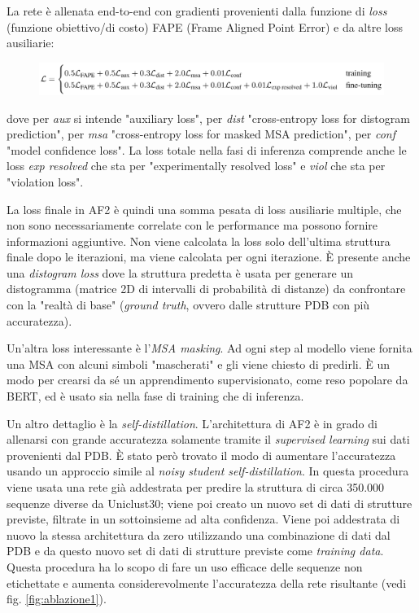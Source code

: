 La rete è allenata end-to-end con gradienti provenienti dalla funzione di \textit{loss} (funzione obiettivo/di costo) FAPE (Frame Aligned Point Error) e da altre loss ausiliarie:

\begin{figure}[!htb]
	\centering
	\includegraphics[scale=0.4]{images/loss.png}
	\label{fig:loss}
\end{figure}

dove per \textit{aux} si intende "auxiliary loss", per \textit{dist} "cross-entropy loss for distogram prediction", per \textit{msa} "cross-entropy loss for masked MSA prediction", per \textit{conf} "model confidence loss". La loss totale nella fasi di inferenza comprende anche le loss \textit{exp resolved} che sta per "experimentally resolved loss" e \textit{viol} che sta per "violation loss".\\

\par La loss finale in AF2 è quindi una somma pesata di loss ausiliarie multiple, che non sono necessariamente correlate con le performance ma possono fornire informazioni aggiuntive. Non viene calcolata la loss solo dell'ultima struttura finale dopo le iterazioni, ma viene calcolata per ogni iterazione. È presente anche una \textit{distogram loss} dove la struttura predetta è usata per generare un distogramma (matrice 2D di intervalli di probabilità di distanze) da confrontare con la "realtà di base" (\textit{ground truth}, ovvero dalle strutture PDB con più accuratezza).

\par Un'altra loss interessante è l'\textit{MSA masking}. Ad ogni step al modello viene fornita una MSA con alcuni simboli "mascherati" e gli viene chiesto di predirli. È un modo per crearsi da sé un apprendimento supervisionato, come reso popolare da BERT, ed è usato sia nella fase di training che di inferenza.\\

\par Un altro dettaglio è la \textit{self-distillation}. L'architettura di AF2 è in grado di allenarsi con grande accuratezza solamente tramite il \textit{supervised learning} sui dati provenienti dal PDB. È stato però trovato il modo di aumentare l'accuratezza usando un approccio simile al \textit{noisy student self-distillation}\supercite{xie2020self}. In questa procedura viene usata una rete già addestrata per predire la struttura di circa 350.000 sequenze diverse da Uniclust30; viene poi creato un nuovo set di dati di strutture previste, filtrate in un sottoinsieme ad alta confidenza. Viene poi addestrata di nuovo la stessa architettura da zero utilizzando una combinazione di dati dal PDB e da questo nuovo set di dati di strutture previste come \textit{training data}. Questa procedura ha lo scopo di fare un uso efficace delle sequenze non etichettate e aumenta considerevolmente l'accuratezza della rete risultante (vedi fig. \ref{fig:ablazione1}). 

